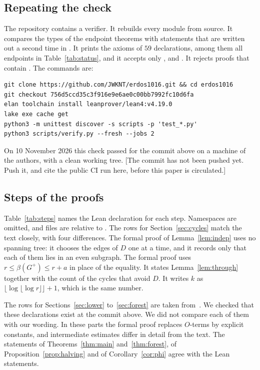 \documentclass[11pt]{article}
\newcommand{\tbd}[1]{\textcolor{red!70!black}{[#1]}}
\theoremstyle{definition}
\theoremstyle{remark}
\numberwithin{equation}{section}
\begin{document}
\subsection{Repeating the check}

The repository contains a verifier. It rebuilds every module from source. It compares the types of
the endpoint theorems with statements that are written out a second time in
. It prints the axioms of $59$ declarations, among them all endpoints
in Table~\ref{tab:status}, and it accepts only ,  and
. It rejects proofs that contain . The commands are:

{\small
\begin{verbatim}
git clone https://github.com/JWKNT/erdos1016.git && cd erdos1016
git checkout 756d5ccd35c3f916e9e6ae0c00bb7992fc10d6fa
elan toolchain install leanprover/lean4:v4.19.0
lake exe cache get
python3 -m unittest discover -s scripts -p 'test_*.py'
python3 scripts/verify.py --fresh --jobs 2
\end{verbatim}}

On 10 November 2026 this check passed for the commit above on a machine of the authors, with a
clean working tree. \tbd{The commit has not been pushed yet. Push it, and cite the public CI run
here, before this paper is circulated.}

\subsection{Steps of the proofs}

Table~\ref{tab:steps} names the Lean declaration for each step. Namespaces are omitted, and files
are relative to . The rows for Section~\ref{sec:cycles} match the text closely,
with four differences. The formal proof of Lemma~\ref{lem:indep} uses no spanning tree: it chooses
the edges of $D$ one at a time, and it records only that each of them lies in an even subgraph. The
formal proof uses $r\le\beta(G^{+})\le r+a$ in place of the equality. It states
Lemma~\ref{lem:through} together with the count of the cycles that avoid $D$. It writes $k$ as
$\lfloor\log\lfloor\log r\rfloor\rfloor+1$, which is the same number.

The rows for Sections~\ref{sec:lower} to~\ref{sec:forest} are taken from~\cite[Appendix~A]{KNT}. We
checked that these declarations exist at the commit above. We did not compare each of them with our
wording. In these parts the formal proof replaces $O$-terms by explicit constants, and intermediate
estimates differ in detail from the text. The statements of Theorems~\ref{thm:main}
and~\ref{thm:forest}, of Proposition~\ref{prop:halving} and of Corollary~\ref{cor:phi} agree with
the Lean statements.
\end{document}
